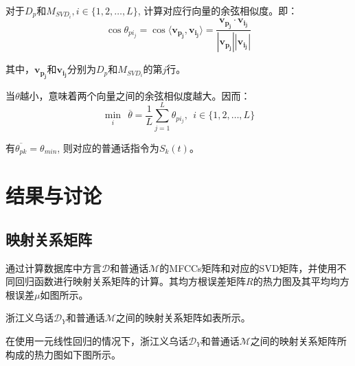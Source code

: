 \documentclass[lang=cn,cite=super]{elegantpaper}
\begin{document}
对于$D_p$和$M_{SVD_i}, i \in \{ 1,2,\ldots, L\}$, 计算对应行向量的余弦相似度。即：
\begin{equation}
    \cos \theta_{pi_{j}} = \cos \langle \bm{v_{p_j}},\bm{v_{i_j}} \rangle = \frac{\bm{v_{p_j}} \cdot \bm{v_{i_j}}}{|\bm{v_{p_j}}||\bm{v_{i_j}}|}
\end{equation}

其中，$\bm{v_{p_j}}$和$\bm{v_{i_j}}$分别为$D_p$和$M_{SVD_i}$的第$j$行。

当$\theta$越小，意味着两个向量之间的余弦相似度越大。因而：
\begin{equation}
    \mathop{\min}_{i} ~~\overline{\theta} = \dfrac{1}{L} \sum_{j=1}^{L} \theta_{pi_{j}}, ~~i \in \{1,2,\ldots, L\}
\end{equation}

有$\overline{\theta_{pk}} = \theta_{min}$, 则对应的普通话指令为$S_k(t)$。
\section{结果与讨论}
\subsection{映射关系矩阵}
通过计算数据库中方言$\mathcal{D}$和普通话$\mathcal{M}$的MFCCs矩阵和对应的SVD矩阵，并使用不同回归函数进行映射关系矩阵的计算。其均方根误差矩阵$R$的热力图及其平均均方根误差$\mu$如图所示。


浙江义乌话$\mathcal{D}_Y$和普通话$\mathcal{M}$之间的映射关系矩阵如表所示。

在使用一元线性回归的情况下，浙江义乌话$\mathcal{D}_Y$和普通话$\mathcal{M}$之间的映射关系矩阵所构成的热力图如下图所示。
\end{document}
